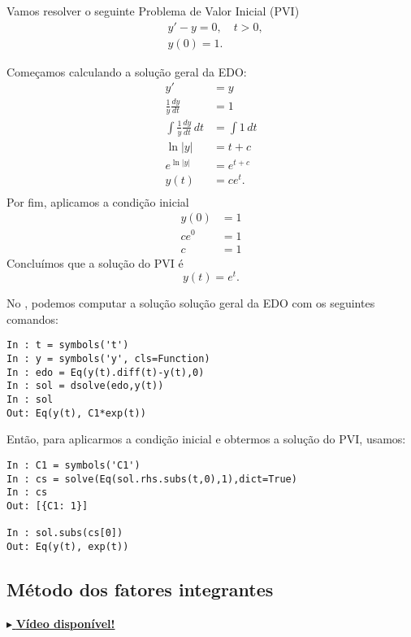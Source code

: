 \begin{ex}
  Vamos resolver o seguinte Problema de Valor Inicial (PVI)
  \begin{align}
    &y' - y = 0, \quad t>0,\\
    &y(0) = 1.
  \end{align}
  
  Começamos calculando a solução geral da EDO:
  \begin{align}
    y' &= y\\
    \frac{1}{y}\frac{dy}{dt} &= 1 \\
     \int \frac{1}{y}\frac{dy}{dt}\,dt &= \int 1\,dt \\
       \ln|y| &= t + c \\
    e^{\ln|y|} &= e^{t+c}\\
    y(t) &= ce^{t}.\\
  \end{align}
  Por fim, aplicamos a condição inicial
  \begin{align}
    y(0) &= 1 \\
    ce^{0} &= 1 \\
    c &= 1
  \end{align}
  Concluímos que a solução do PVI é
  \begin{equation}
    y(t) = e^{t}.
  \end{equation}

  \ifispython
  No \python, podemos computar a solução solução geral da EDO com os seguintes comandos:
\begin{verbatim}
In : t = symbols('t')
In : y = symbols('y', cls=Function)
In : edo = Eq(y(t).diff(t)-y(t),0)
In : sol = dsolve(edo,y(t))
In : sol
Out: Eq(y(t), C1*exp(t))
\end{verbatim}
Então, para aplicarmos a condição inicial e obtermos a solução do PVI, usamos:
\begin{verbatim}
In : C1 = symbols('C1')
In : cs = solve(Eq(sol.rhs.subs(t,0),1),dict=True)
In : cs
Out: [{C1: 1}]

In : sol.subs(cs[0])
Out: Eq(y(t), exp(t))
\end{verbatim}
  \fi
\end{ex}

\subsection{Método dos fatores integrantes}

\begin{flushright}
  \href{https://archive.org/details/edo-ordem-1-linear-coeficientes-constantes-nao-homogenea}{$\blacktriangleright$ \bf Vídeo disponível!}
\end{flushright}

